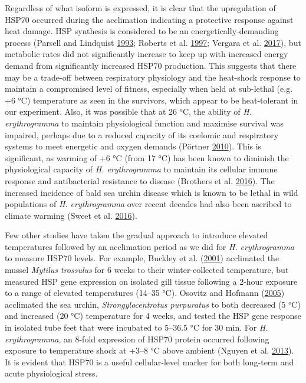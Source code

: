 \documentclass[a4paper,10pt, oneside]{memoir}
\begin{document}
Regardless of what isoform is expressed, it is clear that the upregulation of HSP70 occurred during the acclimation indicating a protective response against heat damage. HSP synthesis is considered to be an energetically-demanding process (Parsell and Lindquist \protect\hyperlink{ref-Parsell1993}{1993}; Roberts et al. \protect\hyperlink{ref-Roberts1997}{1997}; Vergara et al. \protect\hyperlink{ref-Vergara2017}{2017}), but metabolic rates did not significantly increase to keep up with increased energy demand from significantly increased HSP70 production.
This suggests that there may be a trade-off between respiratory physiology and the heat-shock response to maintain a compromised level of fitness, especially when held at sub-lethal (e.g. +6 °C) temperature as seen in the survivors, which appear to be heat-tolerant in our experiment.
Also, it was possible that at 26 °C, the ability of \emph{H. erythrogramma} to maintain physiological function and maximise survival was impaired, perhaps due to a reduced capacity of its coelomic and respiratory systems to meet energetic and oxygen demands (Pörtner \protect\hyperlink{ref-Portner2010}{2010}).
This is significant, as warming of +6 °C (from 17 °C) has been known to diminish the physiological capacity of \emph{H. erythrogramma} to maintain its cellular immune response and antibacterial resistance to disease (Brothers et al. \protect\hyperlink{ref-Brothers2016}{2016}).
The increased incidence of bald sea urchin disease which is known to be lethal in wild populations of \emph{H. erythrogramma} over recent decades had also been ascribed to climate warming (Sweet et al. \protect\hyperlink{ref-Sweet2016}{2016}).

Few other studies have taken the gradual approach to introduce elevated temperatures followed by an acclimation period as we did for \emph{H. erythrogramma} to measure HSP70 levels.
For example, Buckley et al. (\protect\hyperlink{ref-Buckley2001}{2001}) acclimated the mussel \emph{Mytilus trossulus} for 6 weeks to their winter-collected temperature, but measured HSP gene expression on isolated gill tissue following a 2-hour exposure to a range of elevated temperatures (14--35 °C).
Osovitz and Hofmann (\protect\hyperlink{ref-Osovitz2005}{2005}) acclimated the sea urchin, \emph{Strongylocentrotus purpuratus} to both decreased (5 °C) and increased (20 °C) temperature for 4 weeks, and tested the HSP gene response in isolated tube feet that were incubated to 5--36.5 °C for 30 min.
For \emph{H. erythrogramma}, an 8-fold expression of HSP70 protein occurred following exposure to temperature shock at +3--8 °C above ambient (Nguyen et al. \protect\hyperlink{ref-Nguyen2013}{2013}).
It is evident that HSP70 is a useful cellular-level marker for both long-term and acute physiological stress.
\end{document}
